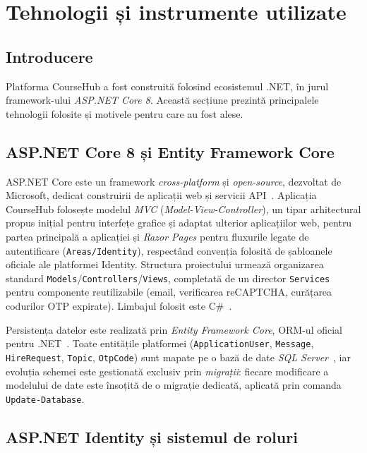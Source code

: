 \chapter{Tehnologii și instrumente utilizate}

\section{Introducere}

Platforma CourseHub a fost construită folosind ecosistemul .NET, în jurul
framework-ului \emph{ASP.NET Core 8}. Această secțiune prezintă principalele
tehnologii folosite și motivele pentru care au fost alese.

\section{ASP.NET Core 8 și Entity Framework Core}

ASP.NET Core este un framework \emph{cross-platform} și \emph{open-source},
dezvoltat de Microsoft, dedicat construirii de aplicații web și servicii
API~\cite{aspnetcore-docs}. Aplicația CourseHub folosește
modelul \emph{MVC} (\emph{Model-View-Controller}), un tipar arhitectural propus
inițial pentru interfețe grafice și adaptat ulterior aplicațiilor
web, pentru partea principală a aplicației și \emph{Razor Pages} pentru fluxurile
legate de autentificare (\texttt{Areas/Identity}), respectând convenția folosită
de șabloanele oficiale ale platformei Identity. Structura proiectului urmează
organizarea standard \texttt{Models}/\texttt{Controllers}/\texttt{Views},
completată de un director \texttt{Services} pentru componente reutilizabile
(email, verificarea reCAPTCHA, curățarea codurilor OTP expirate). Limbajul
folosit este C\#~\cite{csharp-docs}.

Persistența datelor este realizată prin \emph{Entity Framework Core}, ORM-ul
oficial pentru .NET~\cite{efcore-docs}. Toate entitățile platformei
(\texttt{ApplicationUser}, \texttt{Message}, \texttt{HireRequest}, \texttt{Topic},
\texttt{OtpCode}) sunt mapate pe o bază de date \emph{SQL Server}~\cite{sqlserver-docs},
iar evoluția schemei este gestionată exclusiv prin \emph{migrații}: fiecare
modificare a modelului de date este însoțită de o migrație dedicată, aplicată
prin comanda \texttt{Update-Database}.

\section{ASP.NET Identity și sistemul de roluri}


